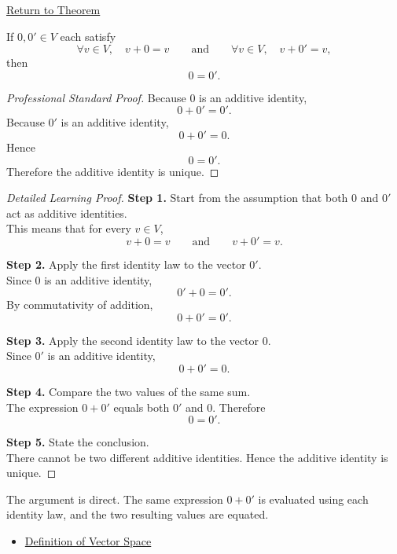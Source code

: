 
\newpage
{}
\label{prf:unique-additive-identity}

\begin{remark*}[Return]
\hyperref[thm:unique-additive-identity]{Return to Theorem}
\end{remark*}

\begin{theorem*}
If $0,0' \in V$ each satisfy
\[
\forall v \in V,\quad v+0=v
\qquad\text{and}\qquad
\forall v \in V,\quad v+0'=v,
\]
then
\[
0=0'.
\]
\end{theorem*}

\begin{proof}[Professional Standard Proof]
\LRAProofBodyStart
Because $0$ is an additive identity,
\[
0+0'=0'.
\]
Because $0'$ is an additive identity,
\[
0+0'=0.
\]
Hence
\[
0=0'.
\]
Therefore the additive identity is unique.
\end{proof}

\begin{proof}[Detailed Learning Proof]
\LRAProofBodyStart

\textbf{Step 1.} Start from the assumption that both $0$ and $0'$ act as additive identities.\\
This means that for every $v \in V$,
\[
v+0=v
\qquad\text{and}\qquad
v+0'=v.
\]

\textbf{Step 2.} Apply the first identity law to the vector $0'$.\\
Since $0$ is an additive identity,
\[
0'+0=0'.
\]
By commutativity of addition,
\[
0+0'=0'.
\]

\textbf{Step 3.} Apply the second identity law to the vector $0$.\\
Since $0'$ is an additive identity,
\[
0+0'=0.
\]

\textbf{Step 4.} Compare the two values of the same sum.\\
The expression $0+0'$ equals both $0'$ and $0$. Therefore
\[
0=0'.
\]

\textbf{Step 5.} State the conclusion.\\
There cannot be two different additive identities. Hence the additive identity is unique.
\end{proof}

\begin{remark*}
The argument is direct. The same expression $0+0'$ is evaluated using each identity law, and the two resulting values are equated.
\end{remark*}

\begin{remark*}[Dependencies]
\hfill
\begin{itemize}
  \item \hyperref[def:vector-space]{Definition of Vector Space}
\end{itemize}
\end{remark*}